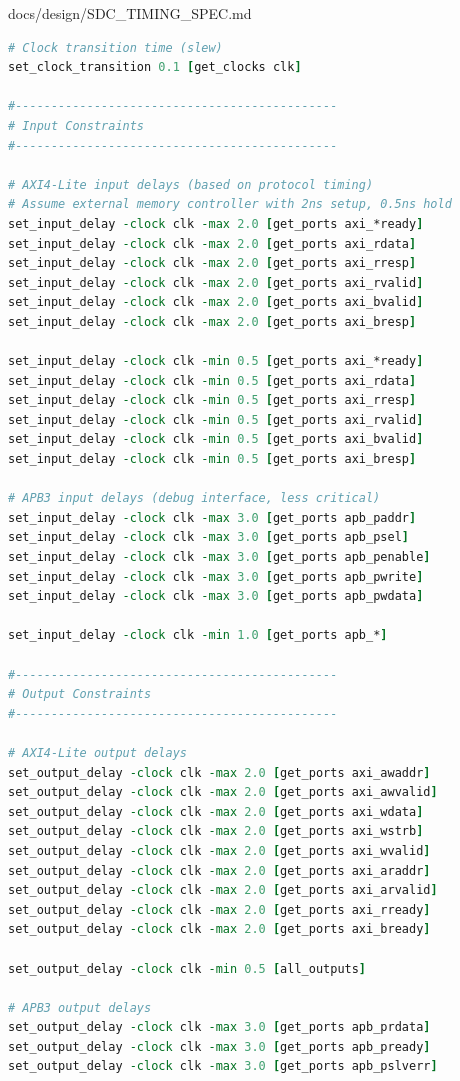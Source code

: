 \begin{relocated}{docs/design/SDC_TIMING_SPEC.md}
\begin{lstlisting}[language=tcl]
# Clock transition time (slew)
set_clock_transition 0.1 [get_clocks clk]

#---------------------------------------------
# Input Constraints
#---------------------------------------------

# AXI4-Lite input delays (based on protocol timing)
# Assume external memory controller with 2ns setup, 0.5ns hold
set_input_delay -clock clk -max 2.0 [get_ports axi_*ready]
set_input_delay -clock clk -max 2.0 [get_ports axi_rdata]
set_input_delay -clock clk -max 2.0 [get_ports axi_rresp]
set_input_delay -clock clk -max 2.0 [get_ports axi_rvalid]
set_input_delay -clock clk -max 2.0 [get_ports axi_bvalid]
set_input_delay -clock clk -max 2.0 [get_ports axi_bresp]

set_input_delay -clock clk -min 0.5 [get_ports axi_*ready]
set_input_delay -clock clk -min 0.5 [get_ports axi_rdata]
set_input_delay -clock clk -min 0.5 [get_ports axi_rresp]
set_input_delay -clock clk -min 0.5 [get_ports axi_rvalid]
set_input_delay -clock clk -min 0.5 [get_ports axi_bvalid]
set_input_delay -clock clk -min 0.5 [get_ports axi_bresp]

# APB3 input delays (debug interface, less critical)
set_input_delay -clock clk -max 3.0 [get_ports apb_paddr]
set_input_delay -clock clk -max 3.0 [get_ports apb_psel]
set_input_delay -clock clk -max 3.0 [get_ports apb_penable]
set_input_delay -clock clk -max 3.0 [get_ports apb_pwrite]
set_input_delay -clock clk -max 3.0 [get_ports apb_pwdata]

set_input_delay -clock clk -min 1.0 [get_ports apb_*]

#---------------------------------------------
# Output Constraints
#---------------------------------------------

# AXI4-Lite output delays
set_output_delay -clock clk -max 2.0 [get_ports axi_awaddr]
set_output_delay -clock clk -max 2.0 [get_ports axi_awvalid]
set_output_delay -clock clk -max 2.0 [get_ports axi_wdata]
set_output_delay -clock clk -max 2.0 [get_ports axi_wstrb]
set_output_delay -clock clk -max 2.0 [get_ports axi_wvalid]
set_output_delay -clock clk -max 2.0 [get_ports axi_araddr]
set_output_delay -clock clk -max 2.0 [get_ports axi_arvalid]
set_output_delay -clock clk -max 2.0 [get_ports axi_rready]
set_output_delay -clock clk -max 2.0 [get_ports axi_bready]

set_output_delay -clock clk -min 0.5 [all_outputs]

# APB3 output delays
set_output_delay -clock clk -max 3.0 [get_ports apb_prdata]
set_output_delay -clock clk -max 3.0 [get_ports apb_pready]
set_output_delay -clock clk -max 3.0 [get_ports apb_pslverr]


\end{lstlisting}
\end{relocated}
